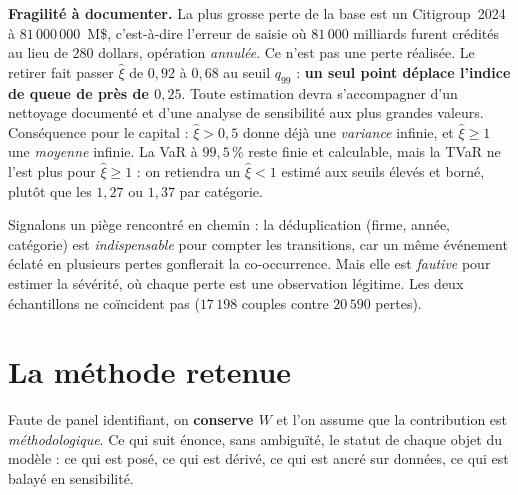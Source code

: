\documentclass[11pt,a4paper]{article}
\begin{document}
\begin{attention}
\textbf{Fragilité à documenter.} La plus grosse perte de la base est un Citigroup~2024 à
$81\,000\,000$~M\$, c'est-à-dire l'erreur de saisie où $81\,000$ milliards furent crédités au
lieu de $280$ dollars, opération \emph{annulée}. Ce n'est pas une perte réalisée. Le retirer
fait passer $\hat\xi$ de $0{,}92$ à $0{,}68$ au seuil $q_{99}$ : \textbf{un seul point déplace
l'indice de queue de près de $0{,}25$}. Toute estimation devra s'accompagner d'un nettoyage
documenté et d'une analyse de sensibilité aux plus grandes valeurs. Conséquence pour le capital :
$\hat\xi > 0{,}5$ donne déjà une \emph{variance} infinie, et $\hat\xi \ge 1$ une \emph{moyenne}
infinie. La VaR à $99{,}5\,\%$ reste finie et calculable, mais la TVaR ne l'est plus pour
$\hat\xi \ge 1$ : on retiendra un $\hat\xi < 1$ estimé aux seuils élevés et borné, plutôt que les
$1{,}27$ ou $1{,}37$ par catégorie.

\smallskip
\noindent Signalons un piège rencontré en chemin : la déduplication (firme, année, catégorie)
est \emph{indispensable} pour compter les transitions, car un même événement éclaté en
plusieurs pertes gonflerait la co-occurrence. Mais elle est \emph{fautive} pour estimer la
sévérité, où chaque perte est une observation légitime. Les deux échantillons ne coïncident
pas ($17\,198$ couples contre $20\,590$ pertes).
\end{attention}

\section{La méthode retenue}
\label{sec:methode}

Faute de panel identifiant, on \textbf{conserve $W$} et l'on assume que la contribution est
\emph{méthodologique}. Ce qui suit énonce, sans ambiguïté, le statut de chaque objet du
modèle : ce qui est posé, ce qui est dérivé, ce qui est ancré sur données, ce qui est balayé
en sensibilité.
\end{document}
